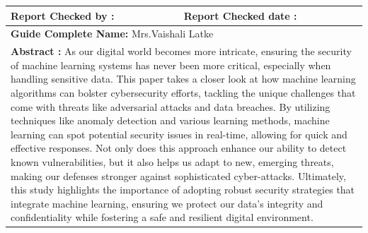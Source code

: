 \documentclass[oneside,a4paper,12pt]{report}
\begin{document}
\begin{flushleft}
\begin{tabular}{|p{9cm}|p{7cm}|}
    \hline
   \vspace{0.5mm}\textbf{Report Checked by :} & \vspace{0.5mm} \textbf{Report Checked date :}\\
    \hline
     \multicolumn{2}{|p{14cm}|}{\vspace{0.5mm}\textbf{Guide Complete Name:} Mrs.Vaishali Latke} \\
    \hline
    \multicolumn{2}{|p{14cm}|}{\vspace{0.5mm}\textbf{Abstract :} As our digital world becomes more intricate, ensuring the security of machine learning systems has never been more critical, especially when handling sensitive data. This paper takes a closer look at how machine learning algorithms can bolster cybersecurity efforts, tackling the unique challenges that come with threats like adversarial attacks and data breaches. By utilizing techniques like anomaly detection and various learning methods, machine learning can spot potential security issues in real-time, allowing for quick and effective responses. Not only does this approach enhance our ability to detect known vulnerabilities, but it also helps us adapt to new, emerging threats, making our defenses stronger against sophisticated cyber-attacks. Ultimately, this study highlights the importance of adopting robust security strategies that integrate machine learning, ensuring we protect our data’s integrity and confidentiality while fostering a safe and resilient digital environment.

 } \\
    \hline
\end{tabular}
\end{flushleft}
\end{document}

